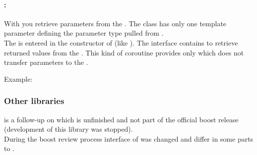 \paragraph*{\pullcoro:}
With \pullcoro you retrieve parameters from the \corofunction. The class
has only one template parameter defining the parameter type pulled from
\corofunction.\\
\newline
The \corofunction is entered in the constructor of \corofunction (like \coro).
The interface contains \coroget to retrieve returned values from the
\corofunction.  This kind of coroutine provides only \pullcoroop which
does not transfer parameters to the \corofunction.

Example:

\subsubsection*{Other libraries}
\boostcoroutine is a follow-up on \boostcorosum which is unfinished and
not part of the official boost release (development of this library was
stopped).\\
During the boost review process interface of \boostcoroutine was changed and
differ in some parts to \boostcorosum.
